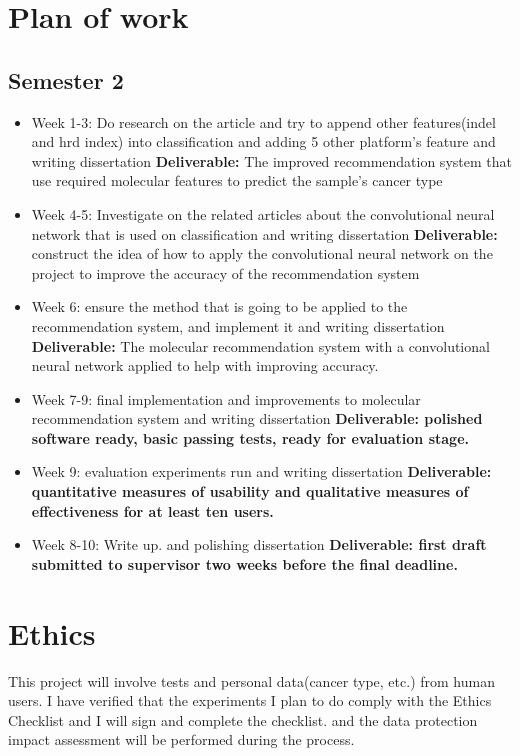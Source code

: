 \documentclass[11pt]{article}
\begin{document}
\section{Plan of work}\label{plan-of-work}

\subsection{Semester 2}

\begin{itemize}
    
    \item
	Week 1-3: Do research on the article and try to append other features(indel and hrd index) into classification and adding 5 other platform's feature and writing dissertation \textbf{Deliverable:}
	The improved recommendation system that use required molecular features to predict the sample's cancer type
	\item
	Week 4-5: Investigate on the related articles about the convolutional neural network that is used on classification and writing dissertation \textbf{Deliverable:}
	construct the idea of how to apply the convolutional neural network on the project to improve the accuracy of the recommendation system
	\item
	Week 6: ensure the method that is going to be applied to the recommendation system, and implement it and writing dissertation
	\textbf{Deliverable:} The molecular recommendation system with a convolutional neural network applied to help with improving accuracy.
	\item
	Week 7-9: final implementation and improvements to molecular recommendation system and writing dissertation
	\textbf{Deliverable: polished software ready, basic passing tests,
	ready for evaluation stage.}
	\item
	Week 9: evaluation experiments run and writing dissertation \textbf{Deliverable: quantitative
	measures of usability and qualitative measures of effectiveness for at
	least ten users.}
	\item
	Week 8-10: Write up. and polishing dissertation \textbf{Deliverable: first draft submitted to
	supervisor two weeks before the final deadline.}
    \end{itemize}
    

\section{Ethics}

This project will involve tests and personal data(cancer type, etc.) from human users. I have verified that the experiments I plan to do comply with the Ethics Checklist and I will sign and complete the checklist. and the data protection impact assessment will be performed during the process.
\end{document}
